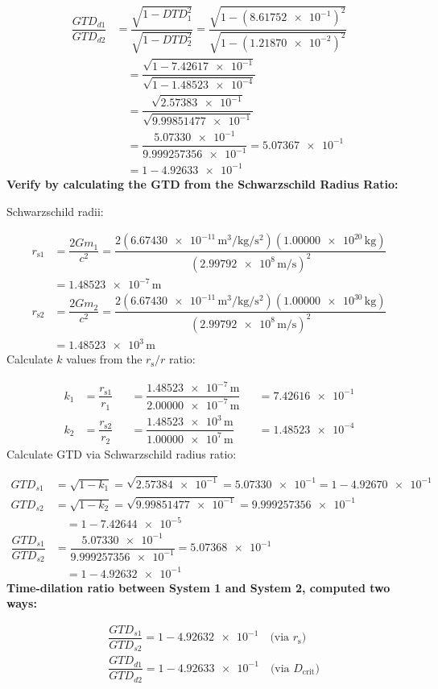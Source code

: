 \documentclass[twoside,twocolumn,9pt,fleqn]{article}
\begin{document}
\begin{mdframed}
\begin{align*}
\dfrac{GTD_{d1}}{GTD_{d2}} &= \dfrac{\sqrt{1-DTD_1^2}}{\sqrt{1-DTD_2^2}} = \dfrac{\sqrt{1-(\num{8.61752e-1})^2}}{\sqrt{1-(\num{1.21870e-2})^2}}\\
&\quad = \dfrac{\sqrt{1-\num{7.42617e-1}}}{\sqrt{1-\num{1.48523e-4}}}\\
&\quad = \dfrac{\sqrt{\num{2.57383e-1}}}{\sqrt{\num{9.99851477e-1}}}\\
&\quad = \dfrac{\num{5.07330e-1}}{\num{9.999257356e-1}} = \num{5.07367e-1}\\
&\quad = 1-\num{4.92633e-1}
\end{align*}
\noindent\textbf{Verify by calculating the GTD from the Schwarzschild Radius Ratio:}\par
\noindent Schwarzschild radii:\par
\begin{align*}
r_{\mathrm{s}1} &= \dfrac{2Gm_1}{c^2} = \dfrac{2(\num{6.67430e-11}\,\unit{\meter\cubed\per\kilogram\per\second\squared})(\num{1.00000e20}\,\unit{\kilogram})}{(\num{2.99792e8}\,\unit{\meter\per\second})^2}\\
&= \num{1.48523e-7}\,\unit{\meter}\\
r_{\mathrm{s}2} &= \dfrac{2Gm_2}{c^2} = \dfrac{2(\num{6.67430e-11}\,\unit{\meter\cubed\per\kilogram\per\second\squared})(\num{1.00000e30}\,\unit{\kilogram})}{(\num{2.99792e8}\,\unit{\meter\per\second})^2}\\
&= \num{1.48523e3}\,\unit{\meter}
\end{align*}
\noindent Calculate $k$ values from the $r_{\mathrm{s}}/r$ ratio:\par
\begin{align*}
k_1 &= \dfrac{r_{\mathrm{s}1}}{r_1} &&= \dfrac{\num{1.48523e-7}\,\unit{\meter}}{\num{2.00000e-7}\,\unit{\meter}} &&= \num{7.42616e-1}\\
k_2 &= \dfrac{r_{\mathrm{s}2}}{r_2} &&= \dfrac{\num{1.48523e3}\,\unit{\meter}}{\num{1.00000e7}\,\unit{\meter}} &&= \num{1.48523e-4}
\end{align*}
\noindent Calculate GTD via Schwarzschild radius ratio:\par
\begin{align*}
GTD_{s1} &= \sqrt{1-k_1} = \sqrt{\num{2.57384e-1}} = \num{5.07330e-1} = 1-\num{4.92670e-1}\\
GTD_{s2} &= \sqrt{1-k_2} = \sqrt{\num{9.99851477e-1}} = \num{9.999257356e-1}\\
&\quad = 1-\num{7.42644e-5}\\
\dfrac{GTD_{s1}}{GTD_{s2}} &= \dfrac{\num{5.07330e-1}}{\num{9.999257356e-1}} = \num{5.07368e-1}\\
&\quad = 1-\num{4.92632e-1}
\end{align*}
\noindent\textbf{Time-dilation ratio between System 1 and System 2, computed two ways:}\par
\begin{align*}
&\dfrac{GTD_{s1}}{GTD_{s2}} = 1-\num{4.92632e-1} \quad \text{(via $r_{\mathrm{s}}$)}\\
&\dfrac{GTD_{d1}}{GTD_{d2}} = 1-\num{4.92633e-1} \quad \text{(via $D_{\mathrm{crit}}$)}
\end{align*}
\end{mdframed}
\end{document}
